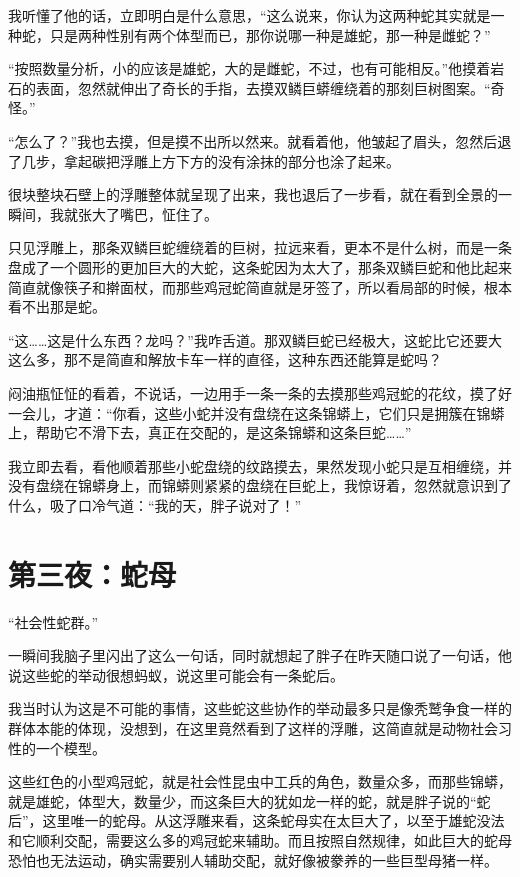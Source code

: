 我听懂了他的话，立即明白是什么意思，“这么说来，你认为这两种蛇其实就是一种蛇，只是两种性别有两个体型而已，那你说哪一种是雄蛇，那一种是雌蛇？”

“按照数量分析，小的应该是雄蛇，大的是雌蛇，不过，也有可能相反。”他摸着岩石的表面，忽然就伸出了奇长的手指，去摸双鳞巨蟒缠绕着的那刻巨树图案。“奇怪。”

“怎么了？”我也去摸，但是摸不出所以然来。就看着他，他皱起了眉头，忽然后退了几步，拿起碳把浮雕上方下方的没有涂抹的部分也涂了起来。

很块整块石壁上的浮雕整体就呈现了出来，我也退后了一步看，就在看到全景的一瞬间，我就张大了嘴巴，怔住了。

只见浮雕上，那条双鳞巨蛇缠绕着的巨树，拉远来看，更本不是什么树，而是一条盘成了一个圆形的更加巨大的大蛇，这条蛇因为太大了，那条双鳞巨蛇和他比起来简直就像筷子和擀面杖，而那些鸡冠蛇简直就是牙签了，所以看局部的时候，根本看不出那是蛇。

“这……这是什么东西？龙吗？”我咋舌道。那双鳞巨蛇已经极大，这蛇比它还要大这么多，那不是简直和解放卡车一样的直径，这种东西还能算是蛇吗？

闷油瓶怔怔的看着，不说话，一边用手一条一条的去摸那些鸡冠蛇的花纹，摸了好一会儿，才道：“你看，这些小蛇并没有盘绕在这条锦蟒上，它们只是拥簇在锦蟒上，帮助它不滑下去，真正在交配的，是这条锦蟒和这条巨蛇……”

我立即去看，看他顺着那些小蛇盘绕的纹路摸去，果然发现小蛇只是互相缠绕，并没有盘绕在锦蟒身上，而锦蟒则紧紧的盘绕在巨蛇上，我惊讶着，忽然就意识到了什么，吸了口冷气道：“我的天，胖子说对了！”

\chapter{第三夜：蛇母}

“社会性蛇群。”

一瞬间我脑子里闪出了这么一句话，同时就想起了胖子在昨天随口说了一句话，他说这些蛇的举动很想蚂蚁，说这里可能会有一条蛇后。

我当时认为这是不可能的事情，这些蛇这些协作的举动最多只是像秃鹫争食一样的群体本能的体现，没想到，在这里竟然看到了这样的浮雕，这简直就是动物社会习性的一个模型。

这些红色的小型鸡冠蛇，就是社会性昆虫中工兵的角色，数量众多，而那些锦蟒，就是雄蛇，体型大，数量少，而这条巨大的犹如龙一样的蛇，就是胖子说的“蛇后”，这里唯一的蛇母。从这浮雕来看，这条蛇母实在太巨大了，以至于雄蛇没法和它顺利交配，需要这么多的鸡冠蛇来辅助。而且按照自然规律，如此巨大的蛇母恐怕也无法运动，确实需要别人辅助交配，就好像被豢养的一些巨型母猪一样。

